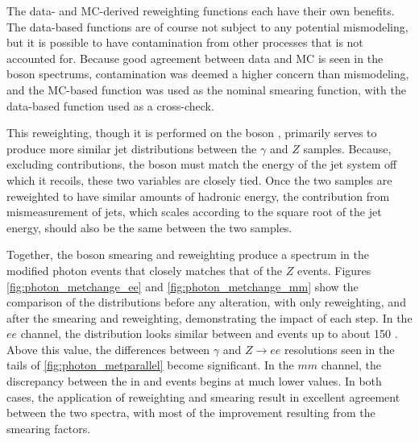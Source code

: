 The data- and \ac{MC}-derived reweighting functions each have their own benefits. The data-based functions are of course not subject to any potential mismodeling, but it is possible to have contamination from other processes that is not accounted for. Because good agreement between data and \ac{MC} is seen in the boson \pt spectrums, contamination was deemed a higher concern than mismodeling, and the \ac{MC}-based function was used as the nominal smearing function, with the data-based function used as a cross-check.

This reweighting, though it is performed on the boson \pt, primarily serves to produce more similar jet distributions between the $\gamma$ and $Z$ samples. Because, excluding \met contributions, the boson \pt must match the energy of the jet system off which it recoils, these two variables are closely tied. Once the two samples are reweighted to have similar amounts of hadronic energy, the \met contribution from mismeasurement of jets, which scales according to the square root of the jet energy, should also be the same between the two samples. 

Together, the boson smearing and \pt reweighting produce a \met spectrum in the modified photon events that closely matches that of the $Z$ events. Figures \ref{fig:photon_metchange_ee} and \ref{fig:photon_metchange_mm} show the comparison of the \met distributions before any alteration, with only \pt reweighting, and after the smearing and reweighting, demonstrating the impact of each step. In the $ee$ channel, the \met distribution looks similar between \dyjets and \gjets events up to about 150 \gev. Above this value, the differences between $\gamma$ and $Z\rightarrow ee$ resolutions seen in the tails of \autoref{fig:photon_metparallel} become significant. In the $mm$ channel, the discrepancy between the \met in \dyjets and \gjets events begins at much lower values. In both cases, the application of \pt reweighting and smearing result in excellent agreement between the two \met spectra, with most of the improvement resulting from the smearing factors. 

